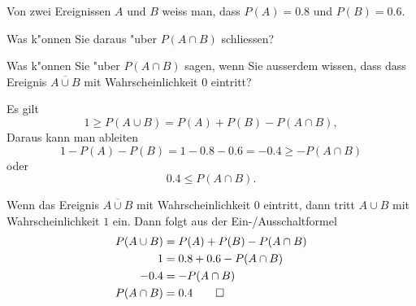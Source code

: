 Von zwei Ereignissen $A$ und $B$ weiss man, dass $P(A)=0.8$ und $P(B)=0.6$.
\begin{teilaufgaben}
\item
Was k"onnen Sie daraus "uber $P(A\cap B)$ schliessen?
\item
Was k"onnen Sie "uber $P(A\cap B)$ sagen, wenn Sie ausserdem wissen, dass 
dass Ereignis $\overline{A\cup B}$ mit Wahrscheinlichkeit $0$ eintritt?
\end{teilaufgaben}

\begin{loesung}
\begin{teilaufgaben}
\item 
Es gilt
\[
1\ge P(A\cup B)=P(A)+P(B)-P(A\cap B),
\]
Daraus kann man ableiten
\[
1-P(A)-P(B)=1-0.8-0.6=-0.4 \ge -P(A\cap B)
\]
oder
\[
0.4\le P(A\cap B).
\]
\item 
Wenn das Ereignis $\overline{A\cup B}$ mit Wahrscheinlichkeit $0$ eintritt,
dann tritt $A\cup B$ mit Wahrscheinlichkeit $1$ ein.
Dann folgt aus der Ein-/Ausschaltformel
\begin{align*}
P(A\cup B)&=P(A)+P(B)-P(A\cap B)\\
1&=0.8+0.6-P(A\cap B)\\
-0.4&=-P(A\cap B)\\
P(A\cap B)&=0.4
\qedhere
\end{align*}
\end{teilaufgaben}
\end{loesung}

